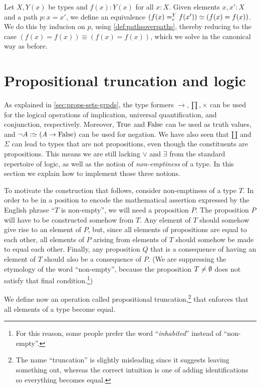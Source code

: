 \begin{definition}\label{def:Dan's-lemma}
Let $X,Y(x)$ be types and $f(x): Y(x)$ for all $x:X$.
Given elements $x,x':X$ and a path $p : x = x'$, we define an equivalence
$(\pathover{f(x)}{Y}{e}{f(x')}) \equiv (f(x)=f(x))$.
We do this by inducion on $p$, using \cref{def:pathsoverpaths},
thereby reducing to the case $(f(x)=f(x)) \equiv (f(x)=f(x))$, 
which we solve in the canonical way as before.
\end{definition}


\section{Propositional truncation and logic}
\label{sec:prop-trunc}

As explained in \cref{sec:props-sets-grpds},
the type formers $\to,\prod,\times$ 
can be used for the logical operations of implication, 
universal quantification, and conjunction, respectively.
Moreover, $\mathrm{True}$ and $\mathrm{False}$ can be used as truth values,
and $\neg A \defeq (A\to\false)$ can be used for negation.
We have also seen that ${\amalg}$ and $\Sigma$ can lead to types
that are not propositions, even though the constituents are
propositions. This means we are still lacking $\vee$ and $\exists$
from the standard repertoire of logic, as well as the notion of \emph{non-emptiness} of a type.
In this section we explain how to implement those three notions.

To motivate the construction that follows, consider non-emptiness of a type $T$.  In order to be in a position to encode the mathematical
assertion expressed by the English phrase ``$T$ is non-empty'', we will need a proposition $P$.  The proposition $P$ will have to be constructed
somehow from $T$.  Any element of $T$ should somehow give rise to an element of $P$, but, since all elements of propositions are equal to each
other, all elements of $P$ arising from elements of $T$ should somehow be made to equal each other.  Finally, any proposition $Q$ that is a
consequence of having an element of $T$ should also be a consequence of $P$.
(We are suppressing the etymology of the word ``non-empty'',
because the proposition $T \ne \emptyset$ does not satisfy that final condition.\footnote{%
  For this reason, some people prefer the word ``\emph{inhabited}''
  instead of ``non-empty''.})

We define now an operation called propositional truncation,\footnote{%
The name ``truncation'' is slightly misleading since it suggests leaving
something out, whereas the correct intuition is one of adding identifications
so everything becomes equal.}
that enforces that all elements of a type become equal.

